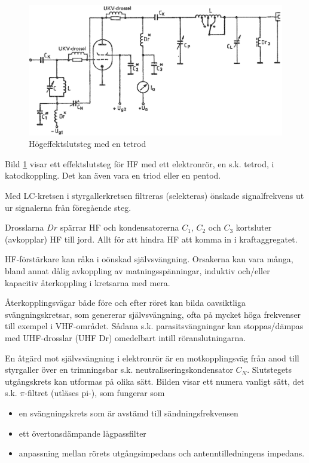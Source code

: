 \begin{figure}
\includegraphics[width=\textwidth]{images/cropped_pdfs/bild_2_3-50.pdf}
\caption{Högeffektslutsteg med en tetrod}
\label{fig:BildII3-50}
\end{figure}

Bild \ref{fig:BildII3-50} visar ett effektslutsteg för HF med ett elektronrör,
en s.k. tetrod, i katodkoppling.
Det kan även vara en triod eller en pentod.

Med LC-kretsen i styrgallerkretsen filtreras (selekteras) önskade
signalfrekvens ut ur signalerna från föregående steg.

Drosslarna \(Dr\) spärrar HF och kondensatorerna \(C_1\), \(C_2\) och
\(C_3\) kortsluter (avkopplar) HF till jord.
Allt för att hindra HF att komma in i kraftaggregatet.

HF-förstärkare kan råka i oönskad självsvängning.
Orsakerna kan vara många, bland annat dålig avkoppling av matningsspänningar,
induktiv och/eller kapacitiv återkoppling i kretsarna med mera.

Återkopplingsvägar både före och efter röret kan bilda oavsiktliga
svängningskretsar, som genererar självsvängning, ofta på mycket höga
frekvenser till exempel i VHF-området.
Sådana s.k. parasitsvängningar kan stoppas/dämpas med UHF-drosslar (UHF Dr)
omedelbart intill röranslutningarna.

En åtgärd mot självsvängning i elektronrör är en motkopplingsväg från
anod till styrgaller över en trimningsbar s.k. neutraliseringskondensator
\(C_N\).
Slutstegets utgångskrets kan utformas på olika sätt.
Bilden visar ett numera vanligt sätt, det s.k. \(\pi\)-filtret (utläses pi-),
som fungerar som
\begin{itemize}
  \item en svängningskrets som är avstämd till sändningsfrekvensen
  \item ett övertonsdämpande lågpassfilter
  \item anpassning mellan rörets utgångsimpedans och antenntilledningens impedans.
\end{itemize}

